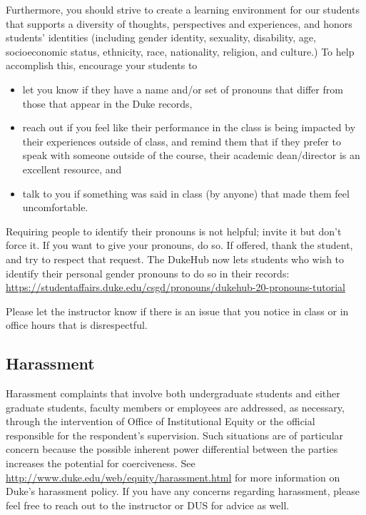 \documentclass[
]{article}
\begin{document}
Furthermore, you should strive to create a learning environment for our students that supports a diversity of thoughts, perspectives and experiences, and honors students' identities (including gender identity, sexuality, disability, age, socioeconomic status, ethnicity, race, nationality, religion, and culture.) To help accomplish this, encourage your students to

\begin{itemize}
\item
  let you know if they have a name and/or set of pronouns that differ from those that appear in the Duke records,
\item
  reach out if you feel like their performance in the class is being impacted by their experiences outside of class, and remind them that if they prefer to speak with someone outside of the course, their academic dean/director is an excellent resource, and
\item
  talk to you if something was said in class (by anyone) that made them feel uncomfortable.
\end{itemize}

Requiring people to identify their pronouns is not helpful; invite it but don't force it. If you want to give your pronouns, do so. If offered, thank the student, and try to respect that request. The DukeHub now lets students who wish to identify their personal gender pronouns to do so in their records: \url{https://studentaffairs.duke.edu/csgd/pronouns/dukehub-20-pronouns-tutorial}

Please let the instructor know if there is an issue that you notice in class or in office hours that is disrespectful.

\hypertarget{harassment}{%
\subsection{Harassment}\label{harassment}}

Harassment complaints that involve both undergraduate students and either graduate students, faculty members or employees are addressed, as necessary, through the intervention of Office of Institutional Equity or the official responsible for the respondent's supervision. Such situations are of particular concern because the possible inherent power differential between the parties increases the potential for coerciveness. See \url{http://www.duke.edu/web/equity/harassment.html} for more information on Duke's harassment policy. If you have any concerns regarding harassment, please feel free to reach out to the instructor or DUS for advice as well.
\end{document}
